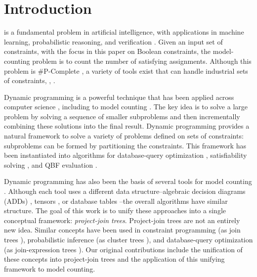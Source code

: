 





\section{Introduction}
\label{sec_intro}
 is a fundamental problem in artificial intelligence, with applications in machine learning, probabilistic reasoning, and verification \cite{domshlak2007probabilistic,gomes2009model,naveh2007constraint}.
Given an input set of constraints, with the focus in this paper on Boolean constraints, the model-counting problem is to count the number of satisfying assignments.
Although this problem is \#P-Complete \cite{valiant1979complexity}, a variety of tools exist that can handle industrial sets of constraints, \eg, \cite{sang2004combining,oztok2015top,darwiche2004new,lagniez2017improved}.

Dynamic programming is a powerful technique that has been applied across computer science \cite{bellman1966dynamic}, including to model counting \cite{bacchus2009solving,samer2010algorithms,jegou2016improving}.
The key idea is to solve a large problem by solving a sequence of smaller subproblems and then incrementally combining these solutions into the final result.
Dynamic programming provides a natural framework to solve a variety of problems defined on sets of constraints: subproblems can be formed by partitioning the constraints.
This framework has been instantiated into algorithms for database-query optimization \cite{mcmahan2004projection}, satisfiability solving \cite{uribe1994ordered,aguirre2001random,pan2005symbolic}, and QBF evaluation \cite{charwat2016bdd}.

Dynamic programming has also been the basis of several tools for model counting \cite{dudek2020addmc,dudek2019efficient,dudek2020parallel,fichte2020exploiting}.
Although each tool uses a different data structure--algebraic decision diagrams (ADDs) \cite{dudek2020addmc}, tensors \cite{dudek2019efficient,dudek2020parallel}, or database tables \cite{fichte2020exploiting}--the overall algorithms have similar structure.
The goal of this work is to unify these approaches into a single conceptual framework: \emph{project-join trees}.
Project-join trees are not an entirely new idea.
Similar concepts have been used in constraint programming (as join trees \cite{dechter1989tree}), probabilistic inference (as cluster trees \cite{shachter1994global}), and database-query optimization (as join-expression trees \cite{mcmahan2004projection}).
Our original contributions include the unification of these concepts into project-join trees and the application of this unifying framework to model counting.

